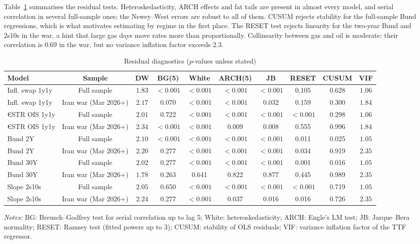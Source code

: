 \documentclass[11pt,a4paper]{article}
\begin{document}
Table~\ref{tab:diag} summarises the residual tests. Heteroskedasticity, ARCH effects and fat tails are present in
almost every model, and serial correlation in several full-sample ones; the Newey--West errors are robust to all of
them. CUSUM rejects stability for the full-sample Bund regressions, which is what motivates estimating by regime in
the first place. The RESET test rejects linearity for the two-year Bund and 2s10s in the war, a hint that large gas days
move rates more than proportionally. Collinearity between gas and oil is moderate: their correlation is 0.69 in the
war, but no variance inflation factor exceeds 2.3.

\begin{table}[htbp]\centering\scriptsize
\caption{Residual diagnostics ($p$-values unless stated)}\label{tab:diag}
\setlength{\tabcolsep}{5pt}
\begin{tabular}{@{}lccccccccc@{}}
\toprule
Model & Sample & DW & BG(5) & White & ARCH(5) & JB & RESET & CUSUM & VIF\\\midrule
Infl. swap 1y1y & Full sample & $1.83$ & $<0.001$ & $<0.001$ & $<0.001$ & $<0.001$ & 0.105 & 0.628 & $1.06$\\
Infl. swap 1y1y & Iran war (Mar 2026+) & $2.17$ & 0.070 & $<0.001$ & $<0.001$ & 0.032 & 0.159 & 0.300 & $1.84$\\
\euro{}STR OIS 1y1y & Full sample & $2.01$ & 0.722 & $<0.001$ & $<0.001$ & $<0.001$ & $<0.001$ & 0.298 & $1.06$\\
\euro{}STR OIS 1y1y & Iran war (Mar 2026+) & $2.34$ & $<0.001$ & $<0.001$ & 0.009 & 0.008 & 0.555 & 0.996 & $1.84$\\
Bund 2Y & Full sample & $2.10$ & $<0.001$ & $<0.001$ & $<0.001$ & $<0.001$ & 0.011 & 0.025 & $1.05$\\
Bund 2Y & Iran war (Mar 2026+) & $2.20$ & 0.277 & $<0.001$ & $<0.001$ & $<0.001$ & 0.034 & 0.919 & $2.35$\\
Bund 30Y & Full sample & $2.02$ & 0.277 & $<0.001$ & $<0.001$ & $<0.001$ & 0.001 & 0.016 & $1.05$\\
Bund 30Y & Iran war (Mar 2026+) & $1.78$ & 0.263 & 0.641 & 0.822 & 0.877 & 0.445 & 0.989 & $2.35$\\
Slope 2s10s & Full sample & $2.05$ & 0.650 & $<0.001$ & $<0.001$ & $<0.001$ & $<0.001$ & 0.719 & $1.05$\\
Slope 2s10s & Iran war (Mar 2026+) & $2.24$ & 0.277 & $<0.001$ & 0.037 & 0.016 & 0.016 & 0.726 & $2.35$\\
\bottomrule
\end{tabular}
\par\vspace{4pt}\begin{minipage}{0.92\textwidth}\scriptsize\textit{Notes:} BG: Breusch--Godfrey test for serial correlation up to lag 5; White: heteroskedasticity; ARCH: Engle's LM test; JB: Jarque--Bera normality; RESET: Ramsey test (fitted powers up to 3); CUSUM: stability of OLS residuals; VIF: variance inflation factor of the TTF regressor.\end{minipage}
\end{table}
\end{document}
